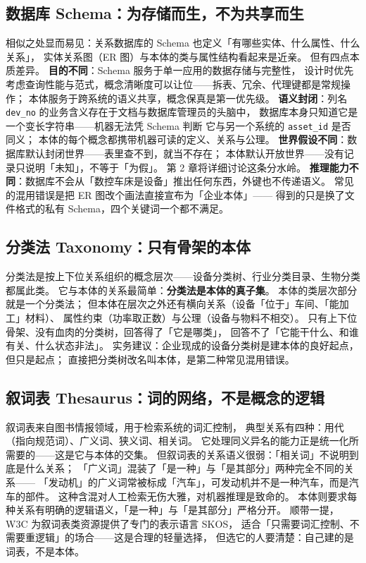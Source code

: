 \subsection{数据库 Schema：为存储而生，不为共享而生}

相似之处显而易见：关系数据库的 Schema 也定义「有哪些实体、什么属性、什么关系」，
实体关系图（ER 图）与本体的类与属性结构看起来是近亲。
但有四点本质差异。
\textbf{目的不同}：Schema 服务于单一应用的数据存储与完整性，
设计时优先考虑查询性能与范式，概念清晰度可以让位——拆表、冗余、代理键都是常规操作；
本体服务于跨系统的语义共享，概念保真是第一优先级。
\textbf{语义封闭}：列名 \texttt{dev\_no} 的业务含义存在于文档与数据库管理员的头脑中，
数据库本身只知道它是一个变长字符串——机器无法凭 Schema 判断
它与另一个系统的 \texttt{asset\_id} 是否同义；
本体的每个概念都携带机器可读的定义、关系与公理。
\textbf{世界假设不同}：数据库默认封闭世界——表里查不到，就当不存在；
本体默认开放世界——没有记录只说明「未知」，不等于「为假」。
第 2 章将详细讨论这条分水岭。
\textbf{推理能力不同}：数据库不会从「数控车床是设备」推出任何东西，外键也不传递语义。
常见的混用错误是把 ER 图改个画法直接宣布为「企业本体」——
得到的只是换了文件格式的私有 Schema，四个关键词一个都不满足。

\subsection{分类法 Taxonomy：只有骨架的本体}

分类法是按上下位关系组织的概念层次——设备分类树、行业分类目录、生物分类都属此类。
它与本体的关系最简单：\textbf{分类法是本体的真子集}。
本体的类层次部分就是一个分类法；
但本体在层次之外还有横向关系（设备「位于」车间、「能加工」材料）、
属性约束（功率取正数）与公理（设备与物料不相交）。
只有上下位骨架、没有血肉的分类树，回答得了「它是哪类」，
回答不了「它能干什么、和谁有关、什么状态非法」。
实务建议：企业现成的设备分类树是建本体的良好起点，但只是起点；
直接把分类树改名叫本体，是第二种常见混用错误。

\subsection{叙词表 Thesaurus：词的网络，不是概念的逻辑}

叙词表来自图书情报领域，用于检索系统的词汇控制，
典型关系有四种：用代（指向规范词）、广义词、狭义词、相关词。
它处理同义异名的能力正是统一化所需要的——这是它与本体的交集。
但叙词表的关系语义很弱：「相关词」不说明到底是什么关系；
「广义词」混装了「是一种」与「是其部分」两种完全不同的关系——
「发动机」的广义词常被标成「汽车」，可发动机并不是一种汽车，而是汽车的部件。
这种含混对人工检索无伤大雅，对机器推理是致命的。
本体则要求每种关系有明确的逻辑语义，「是一种」与「是其部分」严格分开。
顺带一提，W3C 为叙词表类资源提供了专门的表示语言 SKOS，
适合「只需要词汇控制、不需要重逻辑」的场合——这是合理的轻量选择，
但选它的人要清楚：自己建的是词表，不是本体。

